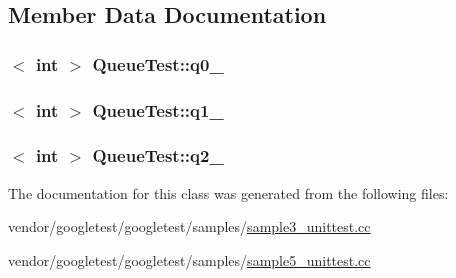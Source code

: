 \subsection{Member Data Documentation}
\subsubsection[{\texorpdfstring{q0\+\_\+}{q0_}}]{$<$ int $>$ Queue\+Test\+::q0\+\_\+\hspace{0.3cm}{\ttfamily [protected]}}\hypertarget{classQueueTest_a0eba1fe2b31d75abd2df688ca5245e22}{}\label{classQueueTest_a0eba1fe2b31d75abd2df688ca5245e22}
\subsubsection[{\texorpdfstring{q1\+\_\+}{q1_}}]{$<$ int $>$ Queue\+Test\+::q1\+\_\+\hspace{0.3cm}{\ttfamily [protected]}}\hypertarget{classQueueTest_a1e55594e71820ba0f1b09591fb328c30}{}\label{classQueueTest_a1e55594e71820ba0f1b09591fb328c30}
\subsubsection[{\texorpdfstring{q2\+\_\+}{q2_}}]{$<$ int $>$ Queue\+Test\+::q2\+\_\+\hspace{0.3cm}{\ttfamily [protected]}}\hypertarget{classQueueTest_aeb7a2e3f6ce2d97d84eb1e01468adc2f}{}\label{classQueueTest_aeb7a2e3f6ce2d97d84eb1e01468adc2f}


The documentation for this class was generated from the following files\+:\begin{DoxyCompactItemize}
\item 
vendor/googletest/googletest/samples/\hyperlink{sample3__unittest_8cc}{sample3\+\_\+unittest.\+cc}\item 
vendor/googletest/googletest/samples/\hyperlink{sample5__unittest_8cc}{sample5\+\_\+unittest.\+cc}\end{DoxyCompactItemize}
